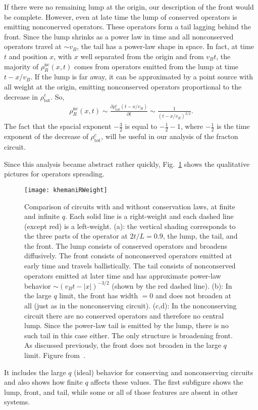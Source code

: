 \documentclass[a4paper,11pt]{article}
\newcommand{\pd}[2]{\frac{\partial #1}{\partial #2}}
\renewcommand{\th}[1]{\frac{1}{#1}}
\newcommand{\abs}[1]{\left| #1 \right|}
\newcommand{\nc}{\text{nc}}
\newcommand{\tot}{\text{tot}}
\begin{document}
If there were no remaining lump at the origin, our description of the front would be complete. However, even at late time the lump of conserved operators is emitting nonconerved operators. These operators form a tail lagging behind the front. Since the lump shrinks as a power law in time and all nonconserved operators travel at $\sim v_B$, the tail has a power-law shape in space. In fact, at time $t$ and position $x$, with $x$ well separated from the origin and from $v_Bt$, the majority of $\rho^\nc_R(x,t)$ comes from operators emitted from the lump at time $t-x/v_B$. If the lump is far away, it can be approximated by a point source with all weight at the origin, emitting nonconserved operators proportional to the decrease in $\rho^c_\tot$. So,
\begin{align}
\rho_R^\nc(x,t)\sim\pd{\rho_\tot^c(t-x/v_B)}{t} \sim\th{(t-x/v_B)^{3/2}}. 
	\label{eqn:powtail}
\end{align}
The fact that the spacial exponent $-\frac{3}{2}$ is equal to $-\th{2}-1$, where $-\th{2}$ is the time exponent of the decrease of $\rho_\tot^c$, will be useful in our analysis of the fracton circuit.

Since this analysis became abstract rather quickly, Fig.~\ref{fig:khemaniRWeight} shows the qualitative pictures for operators spreading.
\begin{figure}
	\centering
	\texttt{[image: khemaniRWeight]}
	\caption{Comparison of circuits with and without conservation laws, at finite and infinite $q$. Each solid line is a right-weight and each dashed line (except red) is a left-weight. (a): the vertical shading corresponds to the three parts of the operator at $2t/L=0.9$, the lump, the tail, and the front. The lump consists of conserved operators and broadens diffusively. The front consists of nonconserved operators emitted at early time and travels ballistically. The tail consists of nonconserved operators emitted at later time and has approximate power-law behavior $\sim(v_Bt-\abs{x})^{-3/2}$ (shown by the red dashed line). (b): In the large $q$ limit, the front has width $=0$ and does not broaden at all (just as in the nonconserving circuit). (c,d): In the nonconserving circuit there are no conserved operators and therefore no central lump. Since the power-law tail is emitted by the lump, there is no such tail in this case either. The only structure is broadening front. As discussed previously, the front does not broaden in the large $q$ limit. Figure from~\cite{KhemaniOpSp}.}
	\label{fig:khemaniRWeight}
\end{figure}
It includes the large $q$ (ideal) behavior for conserving and nonconserving circuits and also shows how finite $q$ affects these values. The first subfigure shows the lump, front, and tail, while some or all of those features are absent in other systems.
\end{document}
